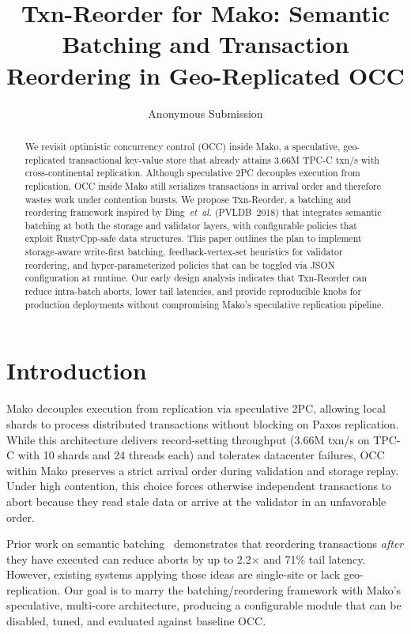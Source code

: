 \documentclass[letterpaper,twocolumn,10pt]{article}
\newcommand{\sysname}{Mako\xspace}
\newcommand{\projname}{Txn-Reorder\xspace}
\begin{document}
\date{}
\title{Txn-Reorder for Mako: Semantic Batching and Transaction Reordering in Geo-Replicated OCC}

\author{
  Anonymous Submission
}
\maketitle

\begin{abstract}
We revisit optimistic concurrency control (OCC) inside \sysname, a speculative, geo-replicated transactional key-value store that already attains 3.66M TPC-C txn/s with cross-continental replication. Although speculative 2PC decouples execution from replication, OCC inside \sysname still serializes transactions in arrival order and therefore wastes work under contention bursts. We propose \projname, a batching and reordering framework inspired by Ding~\emph{et~al.} (PVLDB~2018) that integrates semantic batching at both the storage and validator layers, with configurable policies that exploit RustyCpp-safe data structures. This paper outlines the plan to implement storage-aware write-first batching, feedback-vertex-set heuristics for validator reordering, and hyper-parameterized policies that can be toggled via JSON configuration at runtime. Our early design analysis indicates that \projname can reduce intra-batch aborts, lower tail latencies, and provide reproducible knobs for production deployments without compromising \sysname’s speculative replication pipeline.
\end{abstract}

\section{Introduction}
\sysname decouples execution from replication via speculative 2PC, allowing local shards to process distributed transactions without blocking on Paxos replication. While this architecture delivers record-setting throughput (3.66M txn/s on TPC-C with 10 shards and 24 threads each) and tolerates datacenter failures, OCC within \sysname preserves a strict arrival order during validation and storage replay. Under high contention, this choice forces otherwise independent transactions to abort because they read stale data or arrive at the validator in an unfavorable order.

Prior work on semantic batching~\cite{ding2018txnreorder} demonstrates that reordering transactions \emph{after} they have executed can reduce aborts by up to 2.2$\times$ and 71\% tail latency. However, existing systems applying those ideas are single-site or lack geo-replication. Our goal is to marry the batching/reordering framework with \sysname’s speculative, multi-core architecture, producing a configurable module that can be disabled, tuned, and evaluated against baseline OCC.
\end{document}
